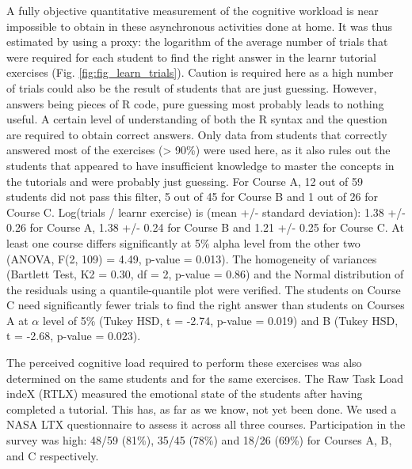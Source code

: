 \documentclass{aims} %
\theoremstyle{definition}
\begin{document}
A fully objective quantitative measurement of the cognitive workload is
near impossible to obtain in these asynchronous activities done at home.
It was thus estimated by using a proxy: the logarithm of the average
number of trials that were required for each student to find the right
answer in the learnr tutorial exercises (Fig.
\ref {fig:fig_learn_trials}). Caution is required here as a high number
of trials could also be the result of students that are just guessing.
However, answers being pieces of R code, pure guessing most probably
leads to nothing useful. A certain level of understanding of both the R
syntax and the question are required to obtain correct answers. Only
data from students that correctly answered most of the exercises
(\textgreater{} 90\%) were used here, as it also rules out the students
that appeared to have insufficient knowledge to master the concepts in
the tutorials and were probably just guessing. For Course A, 12 out of
59 students did not pass this filter, 5 out of 45 for Course B and 1 out
of 26 for Course C. Log(trials / learnr exercise) is (mean +/- standard
deviation): 1.38 +/- 0.26 for Course A, 1.38 +/- 0.24 for Course B and
1.21 +/- 0.25 for Course C. At least one course differs significantly at
5\% alpha level from the other two (ANOVA, F(2, 109) = 4.49, p-value =
0.013). The homogeneity of variances (Bartlett Test, K2 = 0.30, df = 2,
p-value = 0.86) and the Normal distribution of the residuals using a
quantile-quantile plot were verified. The students on Course C need
significantly fewer trials to find the right answer than students on
Courses A at \(\alpha\) level of 5\% (Tukey HSD, t = -2.74, p-value =
0.019) and B (Tukey HSD, t = -2.68, p-value = 0.023).

The perceived cognitive load required to perform these exercises was
also determined on the same students and for the same exercises. The Raw
Task Load indeX (RTLX) measured the emotional state of the students
after having completed a tutorial. This has, as far as we know, not yet
been done. We used a NASA LTX questionnaire to assess it across all
three courses. Participation in the survey was high: 48/59 (81\%), 35/45
(78\%) and 18/26 (69\%) for Courses A, B, and C respectively.
\end{document}
